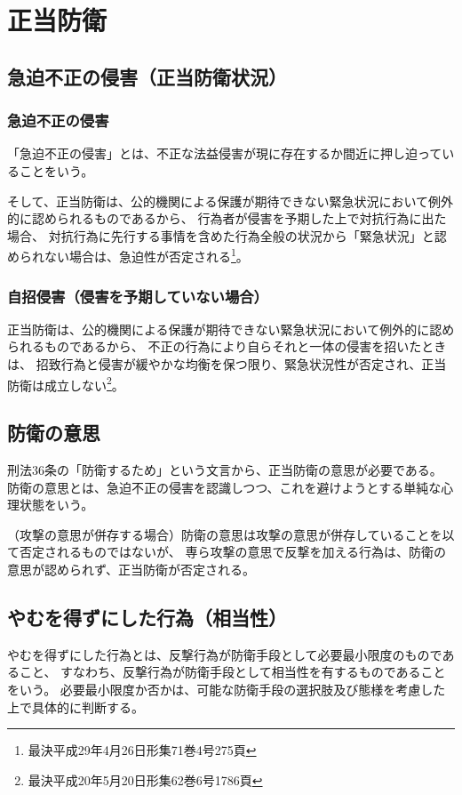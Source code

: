 \documentclass[11pt]{jsarticle}
\begin{document}
	\section{正当防衛}
		\subsection{急迫不正の侵害（正当防衛状況）}
			\subsubsection{急迫不正の侵害}
				「急迫不正の侵害」とは、不正な法益侵害が現に存在するか間近に押し迫っていることをいう。
				
				そして、正当防衛は、公的機関による保護が期待できない緊急状況において例外的に認められるものであるから、
				行為者が侵害を予期した上で対抗行為に出た場合、
				対抗行為に先行する事情を含めた行為全般の状況から「緊急状況」と認められない場合は、急迫性が否定される\footnote{最決平成29年4月26日形集71巻4号275頁}。
			
			\subsubsection{自招侵害（侵害を予期していない場合）}
				正当防衛は、公的機関による保護が期待できない緊急状況において例外的に認められるものであるから、
				不正の行為により自らそれと一体の侵害を招いたときは、
				招致行為と侵害が緩やかな均衡を保つ限り、緊急状況性が否定され、正当防衛は成立しない\footnote{最決平成20年5月20日形集62巻6号1786頁}。
				
		\subsection{防衛の意思}
			刑法36条の「防衛するため」という文言から、正当防衛の意思が必要である。
			防衛の意思とは、急迫不正の侵害を認識しつつ、これを避けようとする単純な心理状態をいう。
			
			（攻撃の意思が併存する場合）防衛の意思は攻撃の意思が併存していることを以て否定されるものではないが、
			専ら攻撃の意思で反撃を加える行為は、防衛の意思が認められず、正当防衛が否定される。
			
		\subsection{やむを得ずにした行為（相当性）}
			やむを得ずにした行為とは、反撃行為が防衛手段として必要最小限度のものであること、
			すなわち、反撃行為が防衛手段として相当性を有するものであることをいう。
			必要最小限度か否かは、可能な防衛手段の選択肢及び態様を考慮した上で具体的に判断する。
\end{document}
